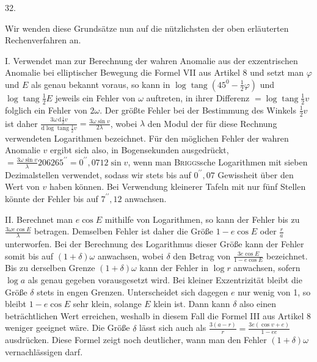 \par{}
\begin{center}
\hypertarget{native-047-article032}{}32.
\end{center}
Wir wenden diese Grundsätze nun auf die nützlichsten der oben erläuterten Rechenverfahren an.

I. Verwendet man zur Berechnung der wahren Anomalie aus der exzentrischen Anomalie bei elliptischer Bewegung die Formel VII aus Artikel 8 und setzt man $\varphi$ und $E$ als genau bekannt voraus, so kann in $\log\operatorname{tang}(45^0-\frac{1}{2}\varphi)$ und $\log\operatorname{tang}\frac{1}{2}E$ jeweils ein Fehler von $\omega$ auftreten, in ihrer Differenz $=\log\operatorname{tang}\frac{1}{2}v$ folglich ein Fehler von $2\omega$. Der größte Fehler bei der Bestimmung des Winkels $\frac{1}{2}v$ ist daher $\frac{3\omega\,\mathrm{d}\frac{1}{2}v}{\mathrm{d}\log\operatorname{tang}\frac{1}{2}v}=\frac{3\omega\sin v}{2\lambda}$, wobei $\lambda$ den Modul der für diese Rechnung verwendeten Logarithmen bezeichnet. Für den möglichen Fehler der wahren Anomalie $v$ ergibt sich also, in Bogensekunden ausgedrückt, $=\frac{3\omega\sin v}{\lambda}206265^{\prime\prime}=0^{\prime\prime}{,}0712\sin v$, wenn man \textsc{Briggs}sche Logarithmen mit sieben Dezimalstellen verwendet, sodass wir stets bis auf $0^{\prime\prime}{,}07$ Gewissheit über den Wert von $v$ haben können. Bei Verwendung kleinerer Tafeln mit nur fünf Stellen könnte der Fehler bis auf $7^{\prime\prime}{,}12$ anwachsen.

II. Berechnet man $e\cos E$ mithilfe von Logarithmen, so kann der Fehler bis zu $\frac{3\omega e\cos E}{\lambda}$ betragen. Demselben Fehler ist daher die Größe $1-e\cos E$ oder $\frac{r}{a}$ unterworfen. Bei der Berechnung des Logarithmus dieser Größe kann der Fehler somit bis auf $(1+\delta)\omega$ anwachsen, wobei $\delta$ den Betrag von $\frac{3e\cos E}{1-e\cos E}$ bezeichnet. Bis zu derselben Grenze $(1+\delta)\omega$ kann der Fehler in $\log r$ anwachsen, sofern $\log a$ als genau gegeben vorausgesetzt wird. Bei kleiner Exzentrizität bleibt die Größe $\delta$ stets in engen Grenzen. Unterscheidet sich dagegen $e$ nur wenig von 1, so bleibt $1-e\cos E$ sehr klein, solange $E$ klein ist. Dann kann $\delta$ also einen beträchtlichen Wert erreichen, weshalb in diesem Fall die Formel III aus Artikel 8 weniger geeignet wäre. Die Größe $\delta$ lässt sich auch als $\frac{3(a-r)}{r}=\frac{3e(\cos v+e)}{1-ee}$ ausdrücken. Diese Formel zeigt noch deutlicher, wann man den Fehler $(1+\delta)\omega$ vernachlässigen darf.

